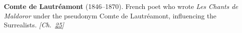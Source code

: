 \textbf{Comte de Lautréamont} (1846–1870). French poet who wrote \emph{Les Chants de Maldoror} under the pseudonym Comte de Lautr\'{e}amont, influencing the Surrealists. \emph{[Ch.~\hyperref[ch:fireflybioluminescence]{25}]}

